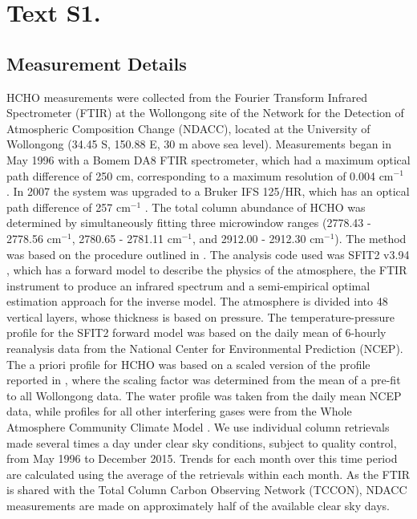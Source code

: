 \documentclass[draft]{agujournal}
\begin{document}
\renewcommand\thefigure{S\arabic{figure}} %
\renewcommand\thetable{S\arabic{table}} %

\section*{Text S1.}

\subsection*{Measurement Details}

HCHO measurements were collected from the Fourier Transform Infrared Spectrometer (FTIR) at the Wollongong site of the Network for the Detection of Atmospheric Composition Change (NDACC), located at the University of Wollongong (34.45 \degree S, 150.88 \degree E, 30 m above sea level). Measurements began in May 1996 with a Bomem DA8 FTIR spectrometer, which had a maximum optical path difference of 250 cm, corresponding to a maximum resolution of 0.004 cm$^{-1}$ \citep{Rinsland2001,Griffith1998}. In 2007 the system was upgraded to a Bruker IFS 125/HR, which has an optical path difference of 257 cm$^{-1}$ \citep{Sussmann2011}. The total column abundance of HCHO was determined by simultaneously fitting three microwindow ranges (2778.43 - 2778.56 cm$^{-1}$, 2780.65 - 2781.11 cm$^{-1}$, and 2912.00 - 2912.30 cm$^{-1}$). The method was based on the procedure outlined in \citet{Jones2009}. The analysis code used was SFIT2 v3.94 \citep{Rinsland1998}, which has a forward model to describe the physics of the atmosphere, the FTIR instrument to produce an infrared spectrum and a semi-empirical optimal estimation approach \citep{Rodgers2000} for the inverse model. The atmosphere is divided into 48 vertical layers, whose thickness is based on pressure. The temperature-pressure profile for the SFIT2 forward model was based on the daily mean of 6-hourly reanalysis data from the National Center for Environmental Prediction (NCEP). The a priori profile for HCHO was based on a scaled version of the profile reported in \citet{Singh2001}, where the scaling factor was determined from the mean of a pre-fit to all Wollongong data. The water profile was taken from the daily mean NCEP data, while profiles for all other interfering gases were from the Whole Atmosphere Community Climate Model \citep{Marsh2013}. We use individual column retrievals made several times a day under clear sky conditions, subject to quality control, from May 1996 to December 2015. Trends for each month over this time period are calculated using the average of the retrievals within each month. As the FTIR is shared with the Total Column Carbon Observing Network (TCCON), NDACC measurements are made on approximately half of the available clear sky days.
\end{document}
